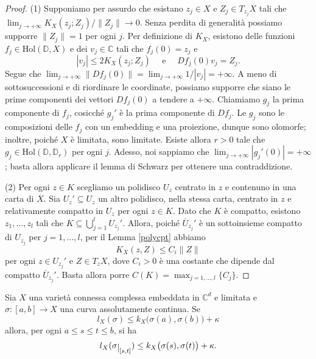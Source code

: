 \begin{proof}
    (1) Supponiamo per assurdo che esistano $z_j \in X$ e $Z_j \in T_{z_j}X$ tali che $\displaystyle \lim_{j \longrightarrow +\infty} K_X(z_j;Z_j)/\|Z_j\| \longrightarrow 0$. Senza perdita di generalità possiamo supporre $\|Z_j\|=1$ per ogni $j$. Per definizione di $K_X$, esistono delle funzioni $f_j\in\text{Hol}(\mathbb{D},X)$ e dei $v_j \in \mathbb{C}$ tali che $f_j(0)=z_j$ e
    $$|v_j| \le 2K_X(z_j;Z_j)\quad\text{ e }\quad Df_j(0)v_j=Z_j.$$
    Segue che $\displaystyle \lim_{j \longrightarrow +\infty}\|Df_j(0)\|=\lim_{j \longrightarrow +\infty}1/|v_j|=+\infty$. A meno di sottosuccessioni e di riordinare le coordinate, possiamo supporre che siano le prime componenti dei vettori $Df_j(0)$ a tendere a $+\infty$. Chiamiamo $g_j$ la prima componente di $f_j$, cosicché $g_j'$ è la prima componente di $Df_j$. Le $g_j$ sono le composizioni delle $f_j$ con un embedding e una proiezione, dunque sono olomorfe; inoltre, poiché $X$ è limitata, sono limitate. Esiste allora $r>0$ tale che $g_j \in \text{Hol}(\mathbb{D},\mathbb{D}_r)$ per ogni $j$. Adesso, noi sappiamo che $\displaystyle\lim_{j\longrightarrow +\infty} |g_j'(0)|=+\infty$; basta allora applicare il lemma di Schwarz per ottenere una contraddizione.

    (2) Per ogni $z \in K$ scegliamo un polidisco $U_z$ centrato in $z$ e contenuno in una carta di $X$. Sia $U_z'\subseteq U_z$ un altro polidisco, nella stessa carta, centrato in $z$ e relativamente compatto in $U_z$ per ogni $z \in K$. Dato che $K$ è compatto, esistono $z_1,\dots,z_l$ tali che $K\subseteq\displaystyle\bigcup_{j=1}^l U_{z_j}'$. Allora, poiché $\overline{U}_{z_j}'$ è un sottoinsieme compatto di $U_{z_j}$ per $j=1,\dots,l$, per il Lemma \ref{polycpt} abbiamo
    $$K_X(z,Z) \le C_i\|Z\|$$
    per ogni $z \in U_{z_j}'$ e $Z\in T_zX$, dove $C_i>0$ è una costante che dipende dal compatto $\overline{U}_{z_j}'$. Basta allora porre $C(K)=\displaystyle\max_{j=1,\dots,l}\{C_j\}$.
\end{proof}

\begin{lm} \label{restrdis}
    Sia $X$ una varietà connessa complessa embeddata in $\mathbb{C}^d$ e limitata e $\sigma:[a,b] \longrightarrow X$ una curva assolutamente continua. Se
    $$l_X(\sigma) \le k_X\big(\sigma(a),\sigma(b)\big)+\kappa$$
    allora, per ogni $a \le s \le t \le b$, si ha
    $$l_X(\sigma\restrict{[s,t]}) \le k_X\big(\sigma(s),\sigma(t)\big)+\kappa.$$
\end{lm}

